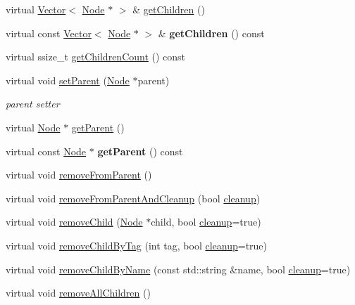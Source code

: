 \begin{DoxyCompactItemize}
\item 
virtual \hyperlink{classVector}{Vector}$<$ \hyperlink{classNode}{Node} $\ast$ $>$ \& \hyperlink{classNode_a25943a94b19e37929b18f93647b58153}{get\+Children} ()
\item 
\mbox{\label{classNode_aedc8104d257021771119ffeb4c171bb3}} 
virtual const \hyperlink{classVector}{Vector}$<$ \hyperlink{classNode}{Node} $\ast$ $>$ \& {\bfseries get\+Children} () const
\item 
virtual ssize\+\_\+t \hyperlink{classNode_abe0559adacadcb3a367c8cf7ba65730e}{get\+Children\+Count} () const
\item 
virtual void \hyperlink{classNode_ab5f0786bcb59591c528efb0b776797fc}{set\+Parent} (\hyperlink{classNode}{Node} $\ast$parent)
\begin{DoxyCompactList}\small\item\em parent setter \end{DoxyCompactList}\item 
virtual \hyperlink{classNode}{Node} $\ast$ \hyperlink{classNode_af4c8a4ae726c6dd984db05c89454652d}{get\+Parent} ()
\item 
\mbox{\label{classNode_a76fd4c36007f3da331591de601dfa377}} 
virtual const \hyperlink{classNode}{Node} $\ast$ {\bfseries get\+Parent} () const
\item 
virtual void \hyperlink{classNode_a26f717b3bf15017bae1a070a121b0289}{remove\+From\+Parent} ()
\item 
virtual void \hyperlink{classNode_ad0ee70d65cb9675b64dc447d821a91e5}{remove\+From\+Parent\+And\+Cleanup} (bool \hyperlink{classNode_aa2de84c6cdeec9cd647d236c30ee0567}{cleanup})
\item 
virtual void \hyperlink{classNode_a872d4a7d389b26b0c6ad7ed99c8b1b65}{remove\+Child} (\hyperlink{classNode}{Node} $\ast$child, bool \hyperlink{classNode_aa2de84c6cdeec9cd647d236c30ee0567}{cleanup}=true)
\item 
virtual void \hyperlink{classNode_ae2e53ef64e2252d07304429889278864}{remove\+Child\+By\+Tag} (int tag, bool \hyperlink{classNode_aa2de84c6cdeec9cd647d236c30ee0567}{cleanup}=true)
\item 
virtual void \hyperlink{classNode_a91086b878367386bd070789f2ea7c8a8}{remove\+Child\+By\+Name} (const std\+::string \&name, bool \hyperlink{classNode_aa2de84c6cdeec9cd647d236c30ee0567}{cleanup}=true)
\item 
virtual void \hyperlink{classNode_a0f6ef5518d2e5dd5be405e98b37ace4a}{remove\+All\+Children} ()

\end{DoxyCompactItemize}
